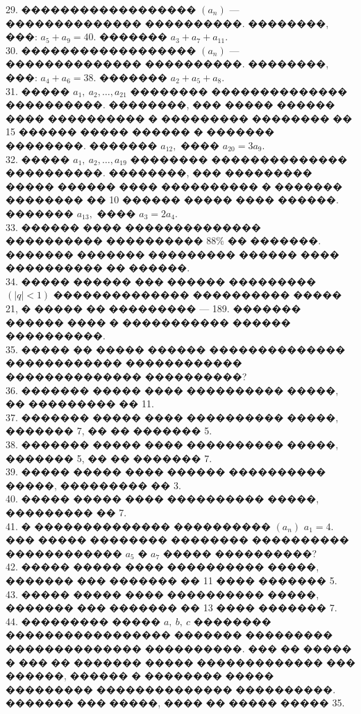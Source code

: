 \documentclass[12pt]{article}
\begin{document}
29. ������������������ $(a_n)$ --- �������������� ����������. ��������, ���: $a_5+a_9=40.$ ������� $a_3+a_7+a_{11}.$\\
30. ������������������ $(a_n)$ --- �������������� ����������. ��������, ���: $a_4+a_6=38.$ ������� $a_2+a_5+a_{8}.$\\
31. ����� $a_1,\ a_2,\ldots,a_{21}$ �������� �������������� ����������. ��������, ��� ����� ������ ���� ���������� � ��������� �������� �� 15 ������ ����� ������ � ������� ��������. ������� $a_{12},$ ���� $a_{20}=3a_9.$\\
32. ����� $a_1,\ a_2,\ldots,a_{19}$ �������� �������������� ����������. ��������, ��� ��������� ����� ������ ���� ���������� � ������� �������� �� 10 ������ ����� ���� ������. ������� $a_{13},$ ���� $a_{3}=2a_4.$\\
33. ������ ���� �������������� ���������� ���������� $88\%$ �� �������. ������� ������� ��������� ������ ���� ���������� �� ������.\\
34. ����� ������ ��� ������ ��������� $(|q|<1)$ �������������� ���������� ����� 21, � ����� �� ��������� --- 189. ������� ������ ���� � ����������� ������ ����������.\\
35. ����� �� ����� ������ �������������� ������������ ������������ �������������� ����������?\\
36. ������� ����� ���� ���������� �����, �� ��������� �� 11.\\
37. ������� ����� ���� ���������� �����, ������� 7, �� �� ������� 5.\\
38. ������� ����� ���� ���������� �����, ������� 5, �� �� ������� 7.\\
39. ����� ����� ���� ������ ���������� �����, ��������� �� 3.\\
40. ����� ����� ���� ���������� �����, ��������� �� 7.\\
41. � �������������� ���������� $(a_n)$ $a_1=4.$ ��� ����� �������� �������� ���������� ������������ $a_5$ � $a_7$ ����� ����������?\\
42. ����� ����� ���� ���������� �����, ������� ��� ������� �� 11 ���� ������� 5.\\
43. ����� ����� ���� ���������� �����, ������� ��� ������� �� 13 ���� ������� 7.\\
44. ��������� ����� $a,\ b,\ c$ �������� ����������������� ������� ��������� �������������� ����������. ��� �� ����� � ��� �� ������� ����� ������������� ��� ������, ������ � �������� ����� ��������� �������������� ����������. ������� ��� �����, ���� �� ����� ����� 35.\\
\end{document}
